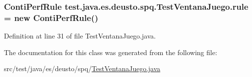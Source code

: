 \subsubsection[{\texorpdfstring{rule}{rule}}]{\setlength{\rightskip}{0pt plus 5cm}Conti\+Perf\+Rule test.\+java.\+es.\+deusto.\+spq.\+Test\+Ventana\+Juego.\+rule = new Conti\+Perf\+Rule()}\hypertarget{classtest_1_1java_1_1es_1_1deusto_1_1spq_1_1_test_ventana_juego_a5ab79d2400e88b633e243e5a46e73400}{}\label{classtest_1_1java_1_1es_1_1deusto_1_1spq_1_1_test_ventana_juego_a5ab79d2400e88b633e243e5a46e73400}


Definition at line 31 of file Test\+Ventana\+Juego.\+java.



The documentation for this class was generated from the following file\+:\begin{DoxyCompactItemize}
\item 
src/test/java/es/deusto/spq/\hyperlink{_test_ventana_juego_8java}{Test\+Ventana\+Juego.\+java}\end{DoxyCompactItemize}
